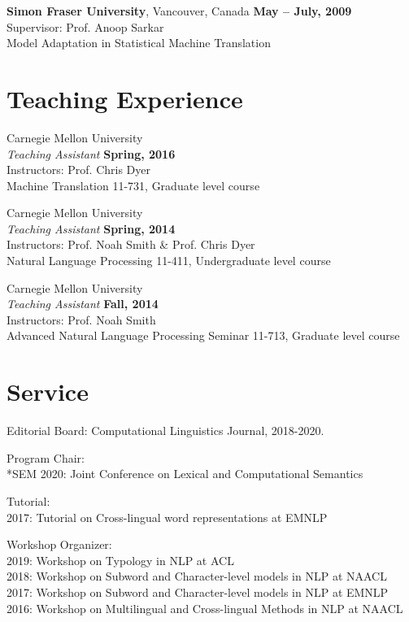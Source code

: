 \documentclass[margin,line]{res}
\begin{document}
\begin{resume}
{\bf Simon Fraser University}, Vancouver, Canada \hfill {\bf May -- July, 2009}\\
Supervisor: Prof. Anoop Sarkar\\
Model Adaptation in Statistical Machine Translation

\section{\sc Teaching Experience}

{Carnegie Mellon University} \\
{\em Teaching Assistant} \hfill {\bf Spring, 2016}\\
Instructors: Prof. Chris Dyer\\
Machine Translation 11-731, Graduate level course

{Carnegie Mellon University} \\
{\em Teaching Assistant} \hfill {\bf Spring, 2014}\\
Instructors: Prof. Noah Smith \& Prof. Chris Dyer\\
Natural Language Processing 11-411, Undergraduate level course

{Carnegie Mellon University}\\
{\em Teaching Assistant} \hfill {\bf Fall, 2014}\\
Instructors: Prof. Noah Smith\\
Advanced Natural Language Processing Seminar 11-713, Graduate level course


\section{\sc Service}
\begin{hangparas}{.25in}{1}

Editorial Board: Computational Linguistics Journal, 2018-2020.

Program Chair:\\
*SEM 2020: Joint Conference on Lexical and Computational Semantics

Tutorial:\\
2017: Tutorial on Cross-lingual word representations at EMNLP

Workshop Organizer:\\
2019: Workshop on Typology in NLP at ACL\\
2018: Workshop on Subword and Character-level models in NLP at NAACL\\
2017: Workshop on Subword and Character-level models in NLP at EMNLP\\
2016: Workshop on Multilingual and Cross-lingual Methods in NLP at NAACL


\end{hangparas}
\end{resume}
\end{document}
